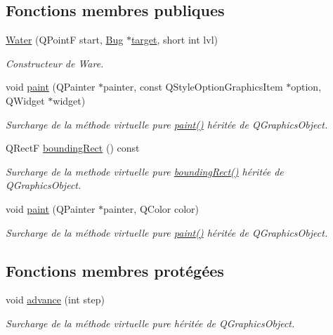 \subsection*{Fonctions membres publiques}
\begin{DoxyCompactItemize}
\item 
\hyperlink{classWater_aee3bec8d65112f496fec8d8cb18cd9af}{Water} (QPointF start, \hyperlink{classBug}{Bug} $\ast$\hyperlink{classProjectile_ae5273bd2c6550b94f38310b69859b093}{target}, short int lvl)
\begin{DoxyCompactList}\small\item\em Constructeur de Ware. \end{DoxyCompactList}\item 
void \hyperlink{classWater_a1f8777c164bb06a357a78cabd9e790a2}{paint} (QPainter $\ast$painter, const QStyleOptionGraphicsItem $\ast$option, QWidget $\ast$widget)
\begin{DoxyCompactList}\small\item\em Surcharge de la méthode virtuelle pure \hyperlink{classWater_a1f8777c164bb06a357a78cabd9e790a2}{paint()} héritée de QGraphicsObject. \end{DoxyCompactList}\item 
QRectF \hyperlink{classProjectile_a0e0b18909c9c154404384707c6515802}{boundingRect} () const 
\begin{DoxyCompactList}\small\item\em Surcharge de la methode virtuelle pure \hyperlink{classProjectile_a0e0b18909c9c154404384707c6515802}{boundingRect()} héritée de QGraphicsObject. \end{DoxyCompactList}\item 
void \hyperlink{classProjectile_aef0d6ffcea7620988cf5446d0c1133fa}{paint} (QPainter $\ast$painter, QColor color)
\begin{DoxyCompactList}\small\item\em Surcharge de la méthode virtuelle pure \hyperlink{classProjectile_aef0d6ffcea7620988cf5446d0c1133fa}{paint()} héritée de QGraphicsObject. \end{DoxyCompactList}\end{DoxyCompactItemize}
\subsection*{Fonctions membres protégées}
\begin{DoxyCompactItemize}
\item 
void \hyperlink{classProjectile_a8e3b4bae49558a0febfce8c1accea72d}{advance} (int step)
\begin{DoxyCompactList}\small\item\em Surcharge de la méthode virtuelle pure héritée de QGraphicsObject. \end{DoxyCompactList}\end{DoxyCompactItemize}


